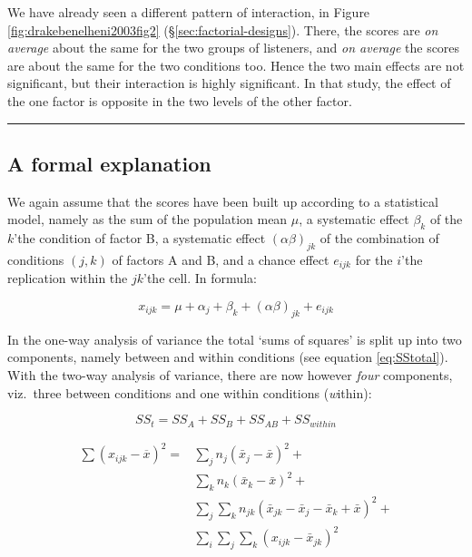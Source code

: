 \documentclass[
]{book}
\begin{document}
We have already seen a different pattern of interaction, in
Figure \ref{fig:drakebenelheni2003fig2} (§\ref{sec:factorial-designs}).
There, the scores are \emph{on average} about the same for the two groups of listeners, and \emph{on average} the scores are about the same for the two conditions too. Hence the two main effects are not significant, but their interaction is highly significant. In that study, the effect of the one factor is opposite in the two levels of the other factor.

\begin{center}\rule{0.5\linewidth}{0.5pt}\end{center}

\hypertarget{a-formal-explanation}{%
\subsection{A formal explanation}\label{a-formal-explanation}}

We again assume that the scores have been built up according to
a statistical model, namely as the sum of the population mean
\(\mu\), a systematic effect \(\beta_k\) of the \(k\)'the condition of
factor B, a systematic effect \((\alpha\beta)_{jk}\) of the combination
of conditions \((j,k)\) of factors A and B, and a chance effect
\(e_{ijk}\) for the \(i\)'the replication within the \(jk\)'the cell. In formula:

\[x_{ijk} = \mu + \alpha_{j} + \beta_{k} + (\alpha\beta)_{jk} + e_{ijk}\]

In the one-way analysis of variance the total `sums of squares' is split up
into two components, namely between and within conditions (see
equation \eqref{eq:SStotal}).
With the two-way analysis of variance, there are now however
\emph{four} components,
viz.~three between conditions and one within conditions (\emph{w}ithin):

\begin{equation}
  \label{eq:SStotal2way-short}
    { SS_t } = SS_A + SS_B + SS_{AB} + SS_{within} 
\end{equation}

\begin{align}
  \label{eq:SStotal2way}
    { \sum (x_{ijk} - \overline{x})^2 } = &  { \sum_j n_j (\bar{x}_j - \bar{x})^2 } + \\ 
    & { \sum_k n_k (\bar{x}_k - \bar{x})^2 } +  \\
    & { \sum_j \sum_k n_{jk} (\bar{x}_{jk} - \bar{x}_j - \bar{x}_k + \bar{x})^2 } + \\
    & { \sum_i \sum_j \sum_k (x_{ijk} - \bar{x}_{jk})^2 } 
\end{align}
\end{document}
